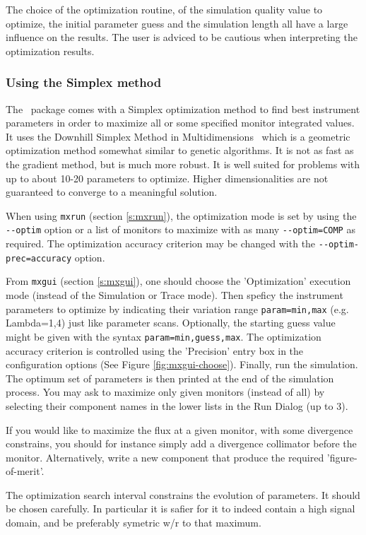 The choice of the optimization routine, of the simulation quality
value to optimize, the initial parameter guess and the simulation
length all have a large influence on the results.
The user is adviced to be cautious when interpreting the optimization results.

\subsubsection{Using the Simplex method}

The \MCX\ package comes with a Simplex optimization method to find best
instrument parameters in order to maximize all or some specified monitor
integrated values. It uses the Downhill Simplex Method in
Multidimensions~\cite{neldermead,NumRecip} which is a geometric optimization
method somewhat similar to genetic algorithms. It is not as fast as the
gradient method, but is much more robust. It is well suited for problems with
up to about 10-20 parameters to optimize. Higher dimensionalities are not
guaranteed to converge to a meaningful solution.

When using \verb+mxrun+ (section \ref{s:mxrun}), the optimization mode is set by using the
\verb+--optim+ option or a list of monitors to maximize with as many
\verb+--optim=COMP+ as required. The optimization accuracy criterion
may be changed with the \verb+--optim-prec=accuracy+ option.

From \verb+mxgui+ (section \ref{s:mxgui}), one should choose the
'Optimization' execution mode (instead of the Simulation or Trace
mode). Then speficy the instrument parameters to optimize by
indicating their variation range \verb+param=min,max+ (e.g. Lambda=1,4) just like
parameter scans. Optionally, the starting guess value might be given with the syntax \verb+param=min,guess,max+. The optimization accuracy criterion is controlled
using the 'Precision' entry box in the configuration options (See
Figure \ref{fig:mxgui-choose}). Finally, run the simulation. The optimum
set of parameters is then printed at the end of the simulation
process. You may ask to maximize only given monitors (instead of all)
by selecting their component names in the lower lists in the Run Dialog (up to 3).

If you would like to maximize the flux at a given monitor, with some
divergence constrains, you should for instance simply add a divergence
collimator before the monitor. Alternatively, write a new component
that produce the required 'figure-of-merit'.

The optimization search interval constrains the evolution of parameters. It should be chosen carefully. In particular it is safier for it to indeed contain a high signal domain, and be preferably symetric w/r to that maximum.


